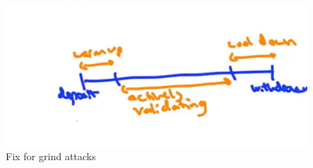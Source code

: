 \begin{figure}[h]
    \centering
    \includegraphics[scale = 0.5]{figures/f52.png}
    \caption{Fix for grind attacks}
    \label{fig:mesh1}
\end{figure}\\


